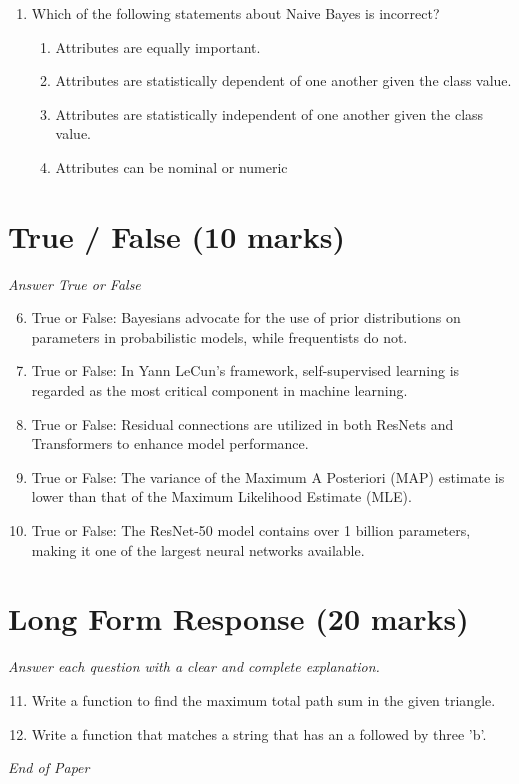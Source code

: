 \documentclass[12pt]{article}
\begin{document}
\begin{enumerate}[label=\arabic*.]
\begin{enumerate}[label=(\alph*)]
    \item 15
\end{enumerate}
\item Which of the following statements about Naive Bayes is incorrect?
\begin{enumerate}[label=(\alph*)]
    \item Attributes are equally important.
    \item Attributes are statistically dependent of one another given the class value.
    \item Attributes are statistically independent of one another given the class value.
    \item Attributes can be nominal or numeric
\end{enumerate}
\end{enumerate}

\section*{True / False (10 marks)}
\textit{Answer True or False}
\begin{enumerate}[label=\arabic*.]
\setcounter{enumi}{5}
\item True or False: Bayesians advocate for the use of prior distributions on parameters in probabilistic models, while frequentists do not.
\item True or False: In Yann LeCun's framework, self-supervised learning is regarded as the most critical component in machine learning.
\item True or False: Residual connections are utilized in both ResNets and Transformers to enhance model performance.
\item True or False: The variance of the Maximum A Posteriori (MAP) estimate is lower than that of the Maximum Likelihood Estimate (MLE).
\item True or False: The ResNet-50 model contains over 1 billion parameters, making it one of the largest neural networks available.
\end{enumerate}

\section*{Long Form Response (20 marks)}
\textit{Answer each question with a clear and complete explanation.}
\begin{enumerate}[label=\arabic*.]
\setcounter{enumi}{10}
\item Write a function to find the maximum total path sum in the given triangle.
\item Write a function that matches a string that has an a followed by three 'b'.
\end{enumerate}

\vfill
\noindent\textit{End of Paper}
\end{document}
